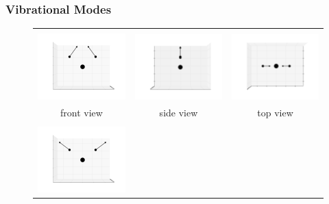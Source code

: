 \documentclass[11pt]{article}
\begin{document}
\subsubsection{Vibrational Modes}
\label{vib}
\begin{figure}[htp]
	\centering
	\begin{tabular}{|ccc|}\hline&&\\
	\includegraphics[width=5.5cm,clip=true,trim=3cm 2cm 3cm 2cm]{images/0-0_6.pdf}&
	\includegraphics[width=5.5cm,clip=true,trim=3cm 2cm 3cm 2cm]{images/0-90_6.pdf}&
	\includegraphics[width=5.5cm,clip=true,trim=3cm 2cm 3cm 2cm]{images/90-0_6.pdf}\\front view&side view&top view\\\hline&&\\
	\includegraphics[width=5.5cm,clip=true,trim=3cm 2cm 3cm 2cm]{images/0-0_7.pdf}&

\end{tabular}
\end{figure}
\end{document}
